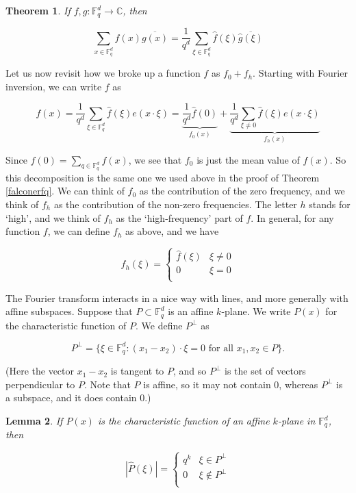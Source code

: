 \documentclass[12pt]{amsart}
\newtheorem{theorem}{Theorem}[section]
\newtheorem{lemma}[theorem]{Lemma}
\newcommand{\FF}{\mathbb{F}}
\newcommand{\CC}{\mathbb{C}}
\begin{document}
\begin{theorem} \label{plancherel} If $f, g: \FF_q^d \rightarrow \CC$, then

$$ \sum_{x \in \FF_q^d} f(x) \overline{g(x)} = \frac{1}{q^d} \sum_{\xi \in \FF_q^d} \hat f(\xi) \overline{ \hat g(\xi)}$$
\end{theorem}

Let us now revisit how we broke up a function $f$ as $f_0 + f_h$.  Starting with Fourier inversion, we can write $f$ as

$$ f(x) = \frac{1}{q^d} \sum_{\xi \in \FF_q^d} \hat f(\xi) e(x \cdot \xi) = \underbrace{\frac{1}{q^d} \hat f(0)}_{f_0(x)} +  \underbrace{\frac{1}{q^d} \sum_{\xi \not= 0} \hat f(\xi) e(x \cdot \xi)}_{f_h(x)}$$

Since $\hat f(0)= \sum_{q \in \FF_q^d} f(x)$, we see that $f_0$ is just the mean value of $f(x)$.  So this decomposition is the same one we used above in the proof of Theorem \ref{falconerfq}.  We can think of $f_0$ as the contribution of the zero frequency, and we think of $f_h$ as the contribution of the non-zero frequencies.  The letter $h$ stands for `high', and we think of $f_h$ as the `high-frequency' part of $f$.  In general, for any function $f$, we can define $f_h$ as above, and we have

$$ \hat f_h(\xi) = \begin{cases} \hat f(\xi) & \xi \not= 0 \\ 0 & \xi=0 \\
    \end{cases}$$

The Fourier transform interacts in a nice way with lines, and more generally with affine subspaces.  
Suppose that $P \subset \FF_q^d$ is an affine $k$-plane.  We write $P(x)$ for the characteristic function of $P$.
We define $P^\perp$ as

$$ P^\perp = \{ \xi \in \FF_q^d: (x_1 - x_2) \cdot \xi = 0 \textrm{ for all } x_1, x_2 \in P\}.$$

(Here the vector $x_1 -x_2$ is tangent to $P$, and so $P^\perp$ is the set of vectors perpendicular to $P$.  Note that $P$ is affine, so it may not contain 0, whereas $P^\perp$ is a subspace, and it does contain 0.)

\begin{lemma} \label{Phat} If $P(x)$ is the characteristic function of an affine $k$-plane in $\FF_q^d$, then

$$ | \hat P(\xi)| = \begin{cases} q^k & \xi \in P^\perp \\ 0 & \xi \notin P^\perp\\ \end{cases}$$

\end{lemma}
\end{document}
